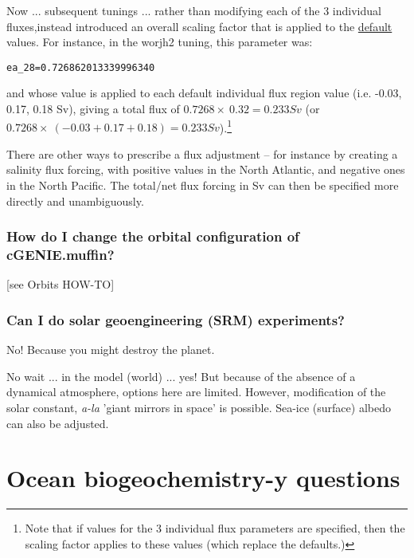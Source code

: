 \documentclass[11pt,fleqn]{book} %
\begin{document}
Now ... subsequent tunings ... rather than modifying each of the 3 individual fluxes,instead introduced an overall scaling factor that is applied to the \uline{default} values. For instance, in the \textsf{\small worjh2} tuning, this parameter was:
\vspace{-1mm}
\begin{verbatim}
ea_28=0.726862013339996340
\end{verbatim}
\vspace{-1mm}
and whose value is applied to each default individual flux region value (i.e. -0.03, 0.17, 0.18 Sv), giving a total  flux of \(0.7268\times\ 0.32 = 0.233 Sv\) (or \(0.7268\times\ (-0.03+0.17+0.18) = 0.233 Sv\)).\footnote{Note that if values for the 3 individual flux parameters are specified, then the scaling factor applies to these values (which replace the defaults.)}

There are other ways to prescribe a flux adjustment -- for instance  by creating a salinity flux forcing, with positive values in the North Atlantic, and negative ones in the North Pacific. The total/net flux forcing in Sv can then be specified more directly and unambiguously.

%
\subsubsection{How do I change the orbital configuration of cGENIE.muffin?}

[see Orbits HOW-TO]

%
\subsubsection{Can I do solar geoengineering (SRM) experiments?}

No! Because you might destroy the planet.

\noindent No wait ... in the model (world) ... yes! But because of the absence of a dynamical atmosphere, options here are limited. However, modification of the solar constant, \textit{a-la} 'giant mirrors in space' is possible. Sea-ice (surface) albedo can also be adjusted.


\newpage


\section{Ocean biogeochemistry-y questions}
\end{document}
